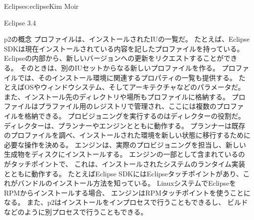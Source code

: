 \begin{aosachapter}{Eclipse}{s:eclipse}{Kim Moir}
\begin{aosasect1}{Eclipse 3.4}
\begin{aosasect2}{p2の概念}
プロファイルは、インストールされたIUの一覧だ。
たとえば、Eclipse SDKは現在インストールされている内容を記したプロファイルを持っている。
Eclipseの内部から、新しいバージョンへの更新をリクエストすることができる。
そのときは、別のIUセットからなる新しいプロファイルを作る。
プロファイルでは、そのインストール環境に関連するプロパティの一覧も提供する。
たとえばOSやウィンドウシステム、そしてアーキテクチャなどのパラメータだ。
また、インストール先のディレクトリや場所もプロファイルに格納する。
プロファイルはプラファイル用のレジストリで管理され、ここには複数のプロファイルを格納できる。
プロビジョニングを実行するのはディレクターの役割だ。
ディレクターは、プランナーやエンジンとともに動作する。
プランナーは既存のプロファイルを調べ、インストールされた環境を新しい状態に移行するために必要な操作を決める。
エンジンは、実際のプロビジョニングを担当し、新しい生成物をディスクにインストールする。
エンジンの一部として含まれているのがタッチポイントで、
これは、インストールされたシステムのランタイム実装とともに動作する。
たとえばEclipse SDKにはEclipseタッチポイントがあり、これがバンドルのインストール方法を知っている。
LinuxシステムでEclipseをRPMからインストールする場合、
エンジンはRPMタッチポイントを使うことになる。
また、p2はインストールをインプロセスで行うこともできるし、
ビルドなどのように別プロセスで行うこともできる。


\end{aosasect2}
\end{aosasect1}
\end{aosachapter}
